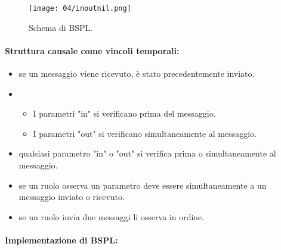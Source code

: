 \begin{figure}[!h]
    \centering
    \texttt{[image: 04/inoutnil.png]}
  \caption{Schema di BSPL.}
\end{figure}

\paragraph{Struttura causale come vincoli temporali:}

\begin{itemize}
  \item {} se un messaggio viene ricevuto, è stato precedentemente inviato. 
  \item {} 
    \begin{itemize}
      \item I parametri "in" si verificano prima del messaggio. 
      \item I parametri "out" si verificano simultaneamente al messaggio.
    \end{itemize}
  \item {} qualsiasi parametro "in" o "out" si verifica prima o simultaneamente al messaggio.
    
  \item {} se un ruolo osserva un parametro deve essere simultaneamente a un messaggio inviato o ricevuto. 
  \item {} se un ruolo invia due messaggi li osserva in ordine.
\end{itemize}

\paragraph{Implementazione di BSPL:}


